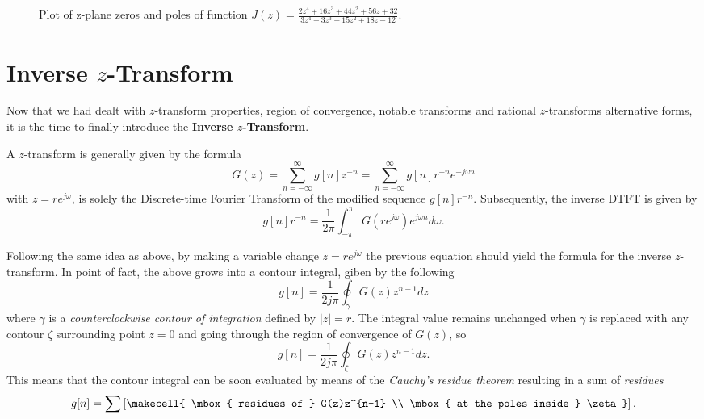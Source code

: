 \documentclass[\documentfontsize, twocolumn]{\classname}
\begin{document}
\begin{figure*}[ht]
\begin{center}
\scalebox{0.3}{

}\caption{Plot of z-plane zeros and poles of function
$J(z) = \frac{
        2z^4 + 16z^3 + 44z^2 + 56z + 32
    } {
        3z^4 + 3z^3 - 15z^2 + 18z - 12
    }$.
}\label{oct:poleZeroPlotExample}
\end{center}
\end{figure*}

\clearpage

\section{Inverse $z$-Transform}

Now that we had dealt with $z$-transform properties, region of convergence, notable transforms and rational $z$-transforms alternative forms, it is the time to finally introduce the \textbf{Inverse $z$-Transform}.

A $z$-transform is generally given by the formula
\[
    G(z) = \sum_{n=-\infty}^\infty g[n]z^{-n} = \sum_{n=-\infty}^\infty g[n]r^{-n}e^{-j\omega n}
\]
with $z=re^{j\omega}$, is solely the Discrete-time Fourier Transform of the modified sequence $g[n]r^{-n}$. Subsequently, the inverse DTFT is given by
\[
    g[n]r^{-n} = \frac 1 {2\pi} \int_{-\pi}^\pi G(re^{j\omega}) e^{j\omega n} d\omega.
\]

Following the same idea as above, by making a variable change $z=re^{j\omega}$ the previous equation should yield the formula for the inverse $z$-transform. In point of fact, the above grows into a contour integral, giben by the following
\begin{equation}\label{eqn:inversezTransform}
    g[n] = \frac{1}{2j\pi}\oint_\gamma G(z) z^{n-1}dz
\end{equation}
where $\gamma$ is a \emph{counterclockwise contour of integration} defined by $|z| = r$. The integral value remains unchanged when $\gamma$ is replaced with any contour $\zeta$ surrounding point $z = 0$ and going through the region of convergence of $G(z)$, so
\[
    g[n] = \frac{1}{2j\pi}\oint_\zeta G(z) z^{n-1}dz.
\]
This means that the contour integral can be soon evaluated by means of the \emph{Cauchy's residue theorem} resulting in a sum of \emph{residues}
\[
    g[n] = \sum\left[ \makecell{ \mbox{ residues of } G(z)z^{n-1} \\ \mbox{ at the poles inside } \zeta} \right].
\]
\end{document}
